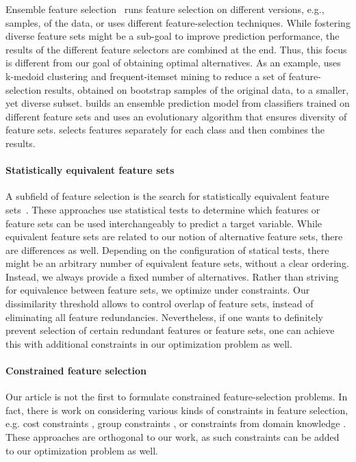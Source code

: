 \documentclass[conference]{IEEEtran}
\theoremstyle{definition}
\begin{document}
Ensemble feature selection~\cite{saeys2008robust, seijo2017ensemble} runs feature selection on different versions, e.g., samples, of the data, or uses different feature-selection techniques.
While fostering diverse feature sets might be a sub-goal to improve prediction performance, the results of the different feature selectors are combined at the end.
Thus, this focus is different from our goal of obtaining optimal alternatives.
As an example, \cite{woznica2012model} uses k-medoid clustering and frequent-itemset mining to reduce a set of feature-selection results, obtained on bootstrap samples of the original data, to a smaller, yet diverse subset.
\cite{liu2019subspace} builds an ensemble prediction model from classifiers trained on different feature sets and uses an evolutionary algorithm that ensures diversity of feature sets.
\cite{guru2018alternative} selects features separately for each class and then combines the results.

\paragraph{Statistically equivalent feature sets}

A subfield of feature selection is the search for statistically equivalent feature sets~\cite{lagani2017feature, borboudakis2021extending}.
These approaches use statistical tests to determine which features or feature sets can be used interchangeably to predict a target variable.
While equivalent feature sets are related to our notion of alternative feature sets, there are differences as well.
Depending on the configuration of statical tests, there might be an arbitrary number of equivalent feature sets, without a clear ordering.
Instead, we always provide a fixed number of alternatives.
Rather than striving for equivalence between feature sets, we optimize under constraints.
Our dissimilarity threshold allows to control overlap of feature sets, instead of eliminating all feature redundancies.
Nevertheless, if one wants to definitely prevent selection of certain redundant features or feature sets, one can achieve this with additional constraints in our optimization problem as well.

\paragraph{Constrained feature selection}

Our article is not the first to formulate constrained feature-selection problems.
In fact, there is work on considering various kinds of constraints in feature selection, e.g. cost constraints \cite{paclik2002feature}, group constraints \cite{yuan2006model}, or constraints from domain knowledge \cite{groves2015toward}.
These approaches are orthogonal to our work, as such constraints can be added to our optimization problem as well.
\end{document}
